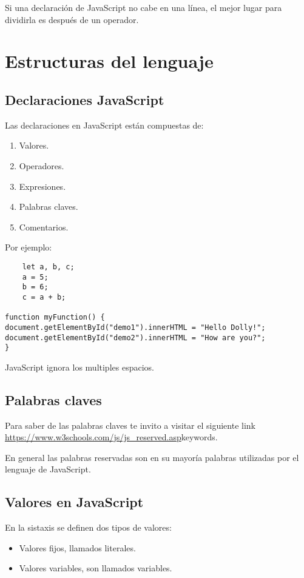 Si una declaraci\'on de JavaScript no cabe en una l\'inea, el mejor lugar para dividirla es despu\'es de un operador. 


\section{Estructuras del lenguaje}
\subsection{Declaraciones JavaScript}

Las declaraciones en JavaScript est\'an compuestas de:
\begin{enumerate}
    \item Valores.
    \item Operadores.
    \item Expresiones.
    \item Palabras claves.
    \item Comentarios.
\end{enumerate}

Por ejemplo: 
\begin{verbatim}
    let a, b, c;
    a = 5;
    b = 6;
    c = a + b;

function myFunction() {
document.getElementById("demo1").innerHTML = "Hello Dolly!";
document.getElementById("demo2").innerHTML = "How are you?";
}
\end{verbatim}


JavaScript ignora los multiples espacios. 


\subsection{Palabras claves}

Para saber de las palabras claves te invito a visitar el siguiente link \url{https://www.w3schools.com/js/js_reserved.asp}{keywords}.

En general las palabras reservadas son en su mayor\'ia palabras utilizadas por el lenguaje de JavaScript.

\subsection{Valores en JavaScript}

En la sistaxis se definen dos tipos de valores: 

\begin{itemize}
    \item Valores fijos, llamados literales.
    \item Valores variables, son llamados variables.
\end{itemize}

